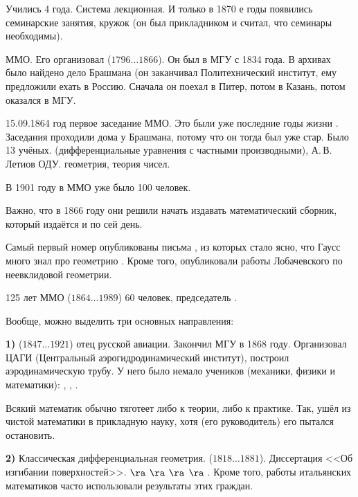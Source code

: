 \documentclass[a4paper,oneside,fleqn,10pt]{article}
\newcommand{\pe}[2]{${#1}\ldots{#2}$}
\begin{document}
Учились 4 года. Система лекционная. И только в 1870 е годы
появились семинарские занятия, кружок  (он был прикладником
и считал, что семинары необходимы).

ММО. Его организовал  (\pe{1796}{1866}).
Он был в МГУ с 1834 года.
В архивах было найдено дело Брашмана (он заканчивал Политехнический институт,
ему предложили ехать в Россию. Сначала он поехал в Питер, потом в Казань, потом
оказался в МГУ.

15.09.1864 год первое заседание ММО. Это были уже последние годы жизни .
Заседания проходили дома у Брашмана, потому что он тогда был уже стар.
Было 13 учёных.  (дифференциальные уравнения с частными производными),
А.\,В.\,Летиов ОДУ. 
геометрия,  теория чисел.

В 1901 году в ММО уже было 100 человек.

Важно, что в 1866 году они решили начать
издавать математический сборник, который издаётся и по сей день.

Самый первый номер опубликованы письма  , из которых стало ясно,
что Гаусс много знал про геометрию . Кроме того, опубликовали
работы Лобачевского по неевклидовой геометрии.

125 лет ММО (\pe{1864}{1989}) 60 человек, председатель .

Вообще, можно выделить три основных направления:

\textbf{1)}  (\pe{1847}{1921}) отец русской авиации.
Закончил МГУ в 1868 году. Организовал \hbox{ЦАГИ} (Центральный аэрогидродинамический институт),
построил аэродинамическую трубу.
У него было немало учеников (механики, физики и математики): , , .

Всякий математик обычно тяготеет либо к теории, либо к практике.
Так,  ушёл из чистой математики в прикладную науку, хотя  (его руководитель)
его пытался остановить.

\textbf{2)} Классическая дифференциальная геометрия.  (\pe{1818}{1881}).
Диссертация <<Об изгибании поверхностей>>.
 $\ra$  $\ra$  $\ra$  $\ra$ .
Кроме того, работы итальянских
математиков часто использовали результаты этих граждан.
\end{document}
